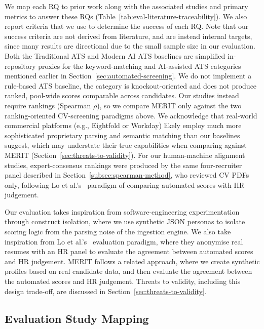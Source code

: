 We map each RQ to prior work along with the associated studies and primary metrics to answer these RQs (Table~\ref{tab:eval-literature-traceability}).
We also report criteria that we use to determine the success of each RQ. Note that our success criteria are not
derived from literature, and are instead internal targets, since many results are directional due to the small sample size
in our evaluation. Both the Traditional ATS and Modern AI ATS baselines are simplified in-repository proxies
for the keyword-matching and AI-assisted ATS categories mentioned earlier in Section~\ref{sec:automated-screening}.
We do not implement a rule-based ATS baseline, the category is knockout-oriented and does not produce ranked, 
pool-wide scores comparable across candidates. Our studies instead require rankings 
(Spearman $\rho$), so we compare MERIT only against the two ranking-oriented CV-screening paradigms above. We acknowledge that real-world commercial platforms (e.g., Eightfold or Workday) likely employ much more sophisticated proprietary parsing and semantic matching than our baselines suggest, which may understate their true capabilities when comparing against MERIT (Section~\ref{sec:threats-to-validity}).
For our human-machine alignment studies, expert-consensus rankings were produced by the same four-recruiter panel described in Section~\ref{subsec:spearman-method},
who reviewed CV PDFs only,
following Lo et al.'s~\cite{lo2025aihiring} paradigm of comparing automated scores with HR judgement.

Our evaluation takes inspiration from software-engineering experimentation~\cite{wohlin_threats}
through construct isolation, where we use synthetic JSON personas to isolate scoring logic from 
the parsing noise of the ingestion engine.
We also take inspiration from Lo et al.'s~\cite{lo2025aihiring} evaluation paradigm, where they 
anonymise real resumes with an HR panel to evaluate the agreement between automated scores and HR judgement.
MERIT follows a related approach, where we create synthetic profiles based on real candidate data,
and then evaluate the agreement between the automated scores and HR judgement.
Threats to validity, including this design trade-off, are discussed in 
Section~\ref{sec:threats-to-validity}.




\subsection{Evaluation Study Mapping}
\label{subsec:eval-codebase-traceability}

